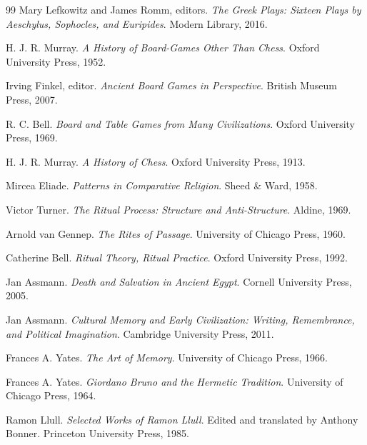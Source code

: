 \documentclass[11pt]{book}
\begin{document}
\begin{thebibliography}{99}
Mary Lefkowitz and James Romm, editors.
\newblock \emph{The Greek Plays: Sixteen Plays by Aeschylus, Sophocles, and Euripides}.
\newblock Modern Library, 2016.

H. J. R. Murray.
\newblock \emph{A History of Board-Games Other Than Chess}.
\newblock Oxford University Press, 1952.

Irving Finkel, editor.
\newblock \emph{Ancient Board Games in Perspective}.
\newblock British Museum Press, 2007.

R. C. Bell.
\newblock \emph{Board and Table Games from Many Civilizations}.
\newblock Oxford University Press, 1969.

H. J. R. Murray.
\newblock \emph{A History of Chess}.
\newblock Oxford University Press, 1913.

Mircea Eliade.
\newblock \emph{Patterns in Comparative Religion}.
\newblock Sheed \& Ward, 1958.

Victor Turner.
\newblock \emph{The Ritual Process: Structure and Anti-Structure}.
\newblock Aldine, 1969.

Arnold van Gennep.
\newblock \emph{The Rites of Passage}.
\newblock University of Chicago Press, 1960.

Catherine Bell.
\newblock \emph{Ritual Theory, Ritual Practice}.
\newblock Oxford University Press, 1992.

Jan Assmann.
\newblock \emph{Death and Salvation in Ancient Egypt}.
\newblock Cornell University Press, 2005.

Jan Assmann.
\newblock \emph{Cultural Memory and Early Civilization: Writing, Remembrance, and Political Imagination}.
\newblock Cambridge University Press, 2011.

Frances A. Yates.
\newblock \emph{The Art of Memory}.
\newblock University of Chicago Press, 1966.

Frances A. Yates.
\newblock \emph{Giordano Bruno and the Hermetic Tradition}.
\newblock University of Chicago Press, 1964.

Ramon Llull.
\newblock \emph{Selected Works of Ramon Llull}.
\newblock Edited and translated by Anthony Bonner. Princeton University Press, 1985.


\end{thebibliography}
\end{document}
